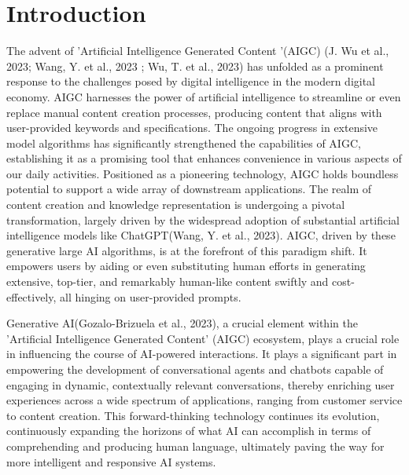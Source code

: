\documentclass[fleqn,10pt]{thescipub} %
\affiliation{\textsuperscript{1}\textit{Department of Computer Engineeering, NK J Somaiya Institute of Technology, Mumbai, India;}} %
\begin{document}
\flushbottom %

\maketitle %


\section*{Introduction} The advent of 'Artificial Intelligence Generated Content '(AIGC) (J. Wu et al., 2023; Wang, Y. et al., 2023 ; Wu, T. et al., 2023) has unfolded as a prominent response to the challenges posed by digital intelligence in the modern digital economy. AIGC harnesses the power of artificial intelligence to streamline or even replace manual content creation processes, producing content that aligns with user-provided keywords and specifications. The ongoing progress in extensive model algorithms has significantly strengthened the capabilities of AIGC, establishing it as a promising tool that enhances convenience in various aspects of our daily activities. Positioned as a pioneering technology, AIGC holds boundless potential to support a wide array of downstream applications. The realm of content creation and knowledge representation is undergoing a pivotal transformation, largely driven by the widespread adoption of substantial artificial intelligence models like ChatGPT(Wang, Y. et al., 2023).  AIGC, driven by these generative large AI algorithms, is at the forefront of this paradigm shift. It empowers users by aiding or even substituting human efforts in generating extensive, top-tier, and remarkably human-like content swiftly and cost-effectively, all hinging on user-provided prompts. 

\baselineskip

Generative AI(Gozalo-Brizuela et al., 2023), a crucial element within the 'Artificial Intelligence Generated Content' (AIGC) ecosystem, plays a crucial role in influencing the course of AI-powered interactions. It plays a significant part in empowering the development of conversational agents and chatbots capable of engaging in dynamic, contextually relevant conversations, thereby enriching user experiences across a wide spectrum of applications, ranging from customer service to content creation. This forward-thinking technology continues its evolution, continuously expanding the horizons of what AI can accomplish in terms of comprehending and producing human language, ultimately paving the way for more intelligent and responsive AI systems.
\end{document}
